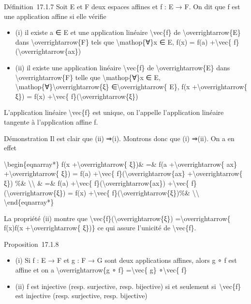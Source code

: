 \documentclass[]{article}
\begin{document}
Définition~17.1.7 Soit E et F deux espaces affines et f : E → F. On dit
que f est une application affine si elle vérifie

\begin{itemize}
\itemsep1pt\parskip0pt
\item
  (i) il existe a ∈ E et une application linéaire
  \textbackslash{}vec\{f\} de \textbackslash{}overrightarrow\{E\} dans
  \textbackslash{}overrightarrow\{F\} tels que
  \textbackslash{}mathop\{∀\}x ∈ E, f(x) = f(a) +\textbackslash{}vec\{
  f\}(\textbackslash{}overrightarrow\{ax\})
\item
  (ii) il existe une application linéaire \textbackslash{}vec\{f\} de
  \textbackslash{}overrightarrow\{E\} dans
  \textbackslash{}overrightarrow\{F\} telle que
  \textbackslash{}mathop\{∀\}x ∈ E,
  \textbackslash{}mathop\{∀\}\textbackslash{}overrightarrow\{ξ\}
  ∈\textbackslash{}overrightarrow\{ E\}, f(x
  +\textbackslash{}overrightarrow\{ ξ\}) = f(x) +\textbackslash{}vec\{
  f\}(\textbackslash{}overrightarrow\{ξ\})
\end{itemize}

L'application linéaire \textbackslash{}vec\{f\} est unique, on l'appelle
l'application linéaire tangente à l'application affine f.

Démonstration Il est clair que (ii) ⇒(i). Montrons donc que (i) ⇒(ii).
On a en effet

\textbackslash{}begin\{eqnarray*\} f(x +\textbackslash{}overrightarrow\{
ξ\})\& =\& f(a +\textbackslash{}overrightarrow\{ ax\}
+\textbackslash{}overrightarrow\{ ξ\}) = f(a) +\textbackslash{}vec\{
f\}(\textbackslash{}overrightarrow\{ax\}
+\textbackslash{}overrightarrow\{ ξ\}) \%\&
\textbackslash{}\textbackslash{} \& =\& f(a) +\textbackslash{}vec\{
f\}(\textbackslash{}overrightarrow\{ax\}) +\textbackslash{}vec\{
f\}(\textbackslash{}overrightarrow\{ξ\}) = f(x) +\textbackslash{}vec\{
f\}(\textbackslash{}overrightarrow\{ξ\})\%\&
\textbackslash{}\textbackslash{} \textbackslash{}end\{eqnarray*\}

La propriété (ii) montre que
\textbackslash{}vec\{f\}(\textbackslash{}overrightarrow\{ξ\})
=\textbackslash{}overrightarrow\{ f(x)f(x
+\textbackslash{}overrightarrow\{ ξ\})\} ce qui assure l'unicité de
\textbackslash{}vec\{f\}.

Proposition~17.1.8

\begin{itemize}
\itemsep1pt\parskip0pt
\item
  (i) Si f : E → F et g : F → G sont deux applications affines, alors g
  ∘ f est affine et on a \textbackslash{}overrightarrow\{g ∘ f\}
  =\textbackslash{}vec\{ g\} ∘\textbackslash{}vec\{ f\}
\item
  (ii) f est injective (resp. surjective, resp. bijective) si et
  seulement si~\textbackslash{}vec\{f\} est injective (resp. surjective,
  resp. bijective)
\end{itemize}
\end{document}
